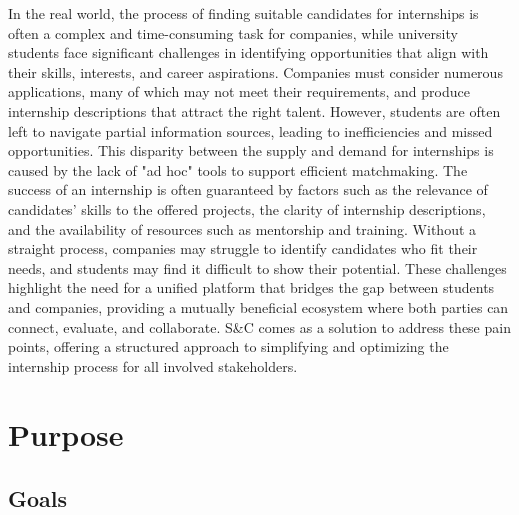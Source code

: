 In the real world, the process of finding suitable candidates for internships is often a complex and time-consuming task for companies, while university students face significant challenges in identifying opportunities that align with their skills, interests, and career aspirations. Companies must consider numerous applications, many of which may not meet their requirements, and produce internship descriptions that attract the right talent. However, students are often left to navigate partial information sources, leading to inefficiencies and missed opportunities.
This disparity between the supply and demand for internships is caused by the lack of "ad hoc" tools to support efficient matchmaking. The success of an internship is often guaranteed by factors such as the relevance of candidates' skills to the offered projects, the clarity of internship descriptions, and the availability of resources such as mentorship and training. Without a straight process, companies may struggle to identify candidates who fit their needs, and students may find it difficult to show their potential.
These challenges highlight the need for a unified platform that bridges the gap between students and companies, providing a mutually beneficial ecosystem where both parties can connect, evaluate, and collaborate. S\&C comes as a solution to address these pain points, offering a structured approach to simplifying and optimizing the internship process for all involved stakeholders.
\newpage

\section{Purpose}
\label{sec:purpose}%

\subsection{Goals}
\label{subsec:goals}%
\setcounter{g}{1}
\newcommand{\cg}{\theg\stepcounter{g}}

